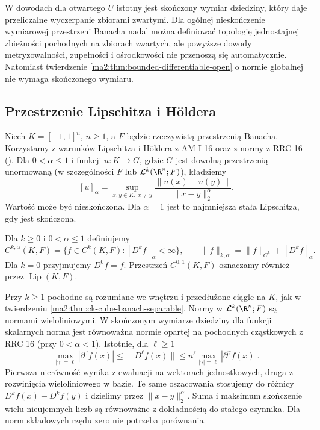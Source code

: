 W dowodach dla otwartego $U$ istotny jest
skończony wymiar dziedziny, który daje
przeliczalne wyczerpanie zbiorami zwartymi.
Dla ogólnej nieskończenie wymiarowej przestrzeni
Banacha nadal można definiować topologię
jednostajnej zbieżności pochodnych na zbiorach
zwartych, ale powyższe dowody metryzowalności,
zupełności i ośrodkowości nie przenoszą się
automatycznie. Natomiast twierdzenie
\ref{ma2:thm:bounded-differentiable-open}
o normie globalnej nie wymaga skończonego wymiaru.


\subsection{Przestrzenie Lipschitza i H\"oldera}

Niech $K=[-1,1]^n$, $n\ge1$, a $F$ będzie
rzeczywistą przestrzenią Banacha. Korzystamy
z warunków Lipschitza i H\"oldera z AM I 16
oraz z normy z RRC 16
(). Dla $0<\alpha\le1$
i funkcji $u:K\to G$, gdzie $G$ jest dowolną
przestrzenią unormowaną (w szczególności $F$
lub $\mathcal L^k(\R^n;F)$), kładziemy
\[
 [u]_\alpha=\sup_{x,y\in K,\ x\ne y}
              \frac{\|u(x)-u(y)\|}{\|x-y\|_2^\alpha}.
\]
Wartość może być nieskończona. Dla $\alpha=1$
jest to najmniejsza stała Lipschitza, gdy jest
skończona.

\begin{definicja}
\label{ma2:def:holder-spaces}
Dla $k\ge0$ i $0<\alpha\le1$ definiujemy
\[
 C^{k,\alpha}(K,F)=
 \{f\in C^k(K,F):[D^kf]_\alpha<\infty\},
 \qquad
 \|f\|_{k,\alpha}=\|f\|_{C^k}+[D^kf]_\alpha.
\]
Dla $k=0$ przyjmujemy $D^0f=f$.
Przestrzeń $C^{0,1}(K,F)$ oznaczamy również
przez $\operatorname{Lip}(K,F)$.
\end{definicja}

Przy $k\ge1$ pochodne są rozumiane we wnętrzu
i przedłużone ciągle na $K$, jak w twierdzeniu
\ref{ma2:thm:ck-cube-banach-separable}.
Normy w $\mathcal L^k(\R^n;F)$ są normami
wieloliniowymi. W skończonym wymiarze dziedziny
dla funkcji skalarnych norma jest równoważna
normie opartej na pochodnych cząstkowych z RRC 16
(przy $0<\alpha<1$). Istotnie, dla $\ell\ge1$
\[
 \max_{|\gamma|=\ell}|\partial^\gamma f(x)|
 \le\|D^\ell f(x)\|
 \le n^\ell\max_{|\gamma|=\ell}|\partial^\gamma f(x)|.
\]
Pierwsza nierówność wynika z ewaluacji na
wektorach jednostkowych, druga z rozwinięcia
wieloliniowego w bazie. Te same oszacowania
stosujemy do różnicy $D^kf(x)-D^kf(y)$
i dzielimy przez $\|x-y\|_2^\alpha$.
Suma i maksimum skończenie wielu nieujemnych
liczb są równoważne z dokładnością do
stałego czynnika. Dla norm składowych
rzędu zero nie potrzeba porównania.


